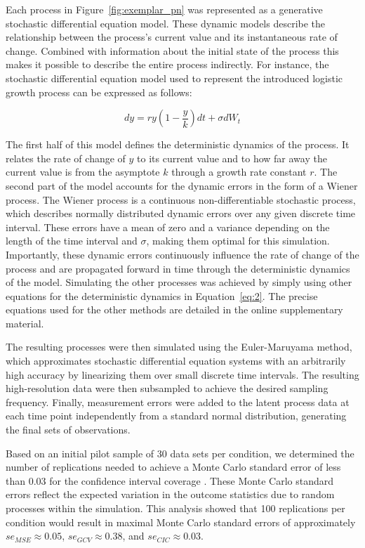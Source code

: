 \documentclass[man, floatsintext]{apa7}
\begin{document}
Each process in Figure~\ref{fig:exemplar_pn} was represented as a generative
stochastic differential equation model. These dynamic models describe the
relationship between the process's current value and its instantaneous rate of
change. Combined with information about the initial state of the process this
makes it possible to describe the entire process indirectly. For instance, the
stochastic differential equation model used to represent the introduced
logistic growth process can be expressed as follows:

\begin{equation} \label{eq:2}
  dy = r y (1-\frac{y}{k})dt + \sigma dW_t
\end{equation}

\noindent The first half of this model defines the deterministic dynamics of
the process. It relates the rate of change of $y$ to its current value and to
how far away the current value is from the asymptote $k$ through a growth rate
constant $r$. The second part of the model accounts for the dynamic errors in
the form of a Wiener process. The Wiener process is a continuous
non-differentiable stochastic process, which describes normally distributed
dynamic errors over any given discrete time interval. These errors have a mean
of zero and a variance depending on the length of the time interval and
$\sigma$, making them optimal for this simulation. Importantly, these dynamic
errors continuously influence the rate of change of the process and are
propagated forward in time through the deterministic dynamics of the model.
Simulating the other processes was achieved by simply using other equations for
the deterministic dynamics in Equation~\ref{eq:2}. The precise equations used
for the other methods are detailed in the online supplementary material.

The resulting processes were then simulated using the Euler-Maruyama method,
which approximates stochastic differential equation systems with an arbitrarily
high accuracy by linearizing them over small discrete time intervals. The
resulting high-resolution data were then subsampled to achieve the desired
sampling frequency. Finally, measurement errors were added to the latent
process data at each time point independently from a standard normal
distribution, generating the final sets of observations.

Based on an initial pilot sample of 30 data sets per condition, we determined
the number of replications needed to achieve a Monte Carlo standard error of
less than 0.03 for the confidence interval coverage
\parencite{siepe_simulation_2023}. These Monte Carlo standard errors reflect
the expected variation in the outcome statistics due to random processes within
the simulation. This analysis showed that 100 replications per condition
would result in maximal Monte Carlo standard errors of approximately $se_{MSE}
  \approx 0.05$, $se_{GCV} \approx 0.38$, and $se_{CIC} \approx 0.03$.
\end{document}
